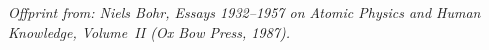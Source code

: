 \documentclass[12pt,a4paper]{article}
\begin{document}
\thispagestyle{fancy}
{\footnotesize\itshape Offprint from: Niels Bohr, \emph{Essays 1932--1957 on Atomic Physics and Human Knowledge}, Volume~II
 (Ox Bow Press, 1987).\par}
\medskip


\end{document}
